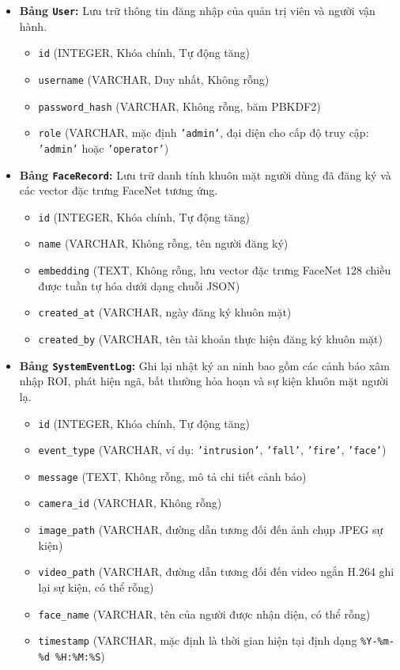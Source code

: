 \documentclass[12pt,a4paper]{article}
\begin{document}
\begin{itemize}
    \item \textbf{Bảng \texttt{User}:} Lưu trữ thông tin đăng nhập của quản trị viên và người vận hành.
    \begin{itemize}
        \item \texttt{id} (INTEGER, Khóa chính, Tự động tăng)
        \item \texttt{username} (VARCHAR, Duy nhất, Không rỗng)
        \item \texttt{password\_hash} (VARCHAR, Không rỗng, băm PBKDF2)
        \item \texttt{role} (VARCHAR, mặc định \texttt{'admin'}, đại diện cho cấp độ truy cập: \texttt{'admin'} hoặc \texttt{'operator'})
    \end{itemize}
    \item \textbf{Bảng \texttt{FaceRecord}:} Lưu trữ danh tính khuôn mặt người dùng đã đăng ký và các vector đặc trưng FaceNet tương ứng.
    \begin{itemize}
        \item \texttt{id} (INTEGER, Khóa chính, Tự động tăng)
        \item \texttt{name} (VARCHAR, Không rỗng, tên người đăng ký)
        \item \texttt{embedding} (TEXT, Không rỗng, lưu vector đặc trưng FaceNet 128 chiều được tuần tự hóa dưới dạng chuỗi JSON)
        \item \texttt{created\_at} (VARCHAR, ngày đăng ký khuôn mặt)
        \item \texttt{created\_by} (VARCHAR, tên tài khoản thực hiện đăng ký khuôn mặt)
    \end{itemize}
    \item \textbf{Bảng \texttt{SystemEventLog}:} Ghi lại nhật ký an ninh bao gồm các cảnh báo xâm nhập ROI, phát hiện ngã, bất thường hỏa hoạn và sự kiện khuôn mặt người lạ.
    \begin{itemize}
        \item \texttt{id} (INTEGER, Khóa chính, Tự động tăng)
        \item \texttt{event\_type} (VARCHAR, ví dụ: \texttt{'intrusion'}, \texttt{'fall'}, \texttt{'fire'}, \texttt{'face'})
        \item \texttt{message} (TEXT, Không rỗng, mô tả chi tiết cảnh báo)
        \item \texttt{camera\_id} (VARCHAR, Không rỗng)
        \item \texttt{image\_path} (VARCHAR, đường dẫn tương đối đến ảnh chụp JPEG sự kiện)
        \item \texttt{video\_path} (VARCHAR, đường dẫn tương đối đến video ngắn H.264 ghi lại sự kiện, có thể rỗng)
        \item \texttt{face\_name} (VARCHAR, tên của người được nhận diện, có thể rỗng)
        \item \texttt{timestamp} (VARCHAR, mặc định là thời gian hiện tại định dạng \texttt{\%Y-\%m-\%d \%H:\%M:\%S})
    \end{itemize}
\end{itemize}
\end{document}
